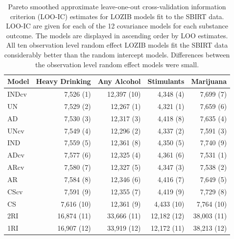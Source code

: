 \documentclass[12pt]{article}
\begin{document}
\begin{table}
	\caption{Pareto smoothed approximate leave-one-out cross-validation information criterion (LOO-IC) estimates for LOZIB models fit to the SBIRT data. LOO-IC are given for each of the 12 covariance models for each substance outcome. The models are displayed in ascending order by LOO estimates. All ten observation level random effect LOZIB models fit the SBIRT data considerably better than the random intercept models. Differences between the observation level random effect models were small.}
	\centering
	\begin{tabular}[t]{lrrrr}
		\toprule
		Model & Heavy Drinking & Any Alcohol& Stimulants & Marijuana\\
		\midrule
		INDcv & 7,526 (1) & 12,397 (10) & 4,348 (4) & 7,699 (7)\\
		UN & 7,529 (2) & 12,267 (1) & 4,321 (1) & 7,659 (6)\\
		AD & 7,530 (3) & 12,317 (3) & 4,418 (8) & 7,635 (4)\\
		UNcv & 7,549 (4) & 12,296 (2) & 4,337 (2)  & 7,591 (3)\\
		IND & 7,559 (5) & 12,361 (8) & 4,350 (5) & 7,740 (9)\\
		ADcv & 7,577 (6) & 12,325 (4) & 4,361 (6) & 7,531 (1)\\
		ARcv & 7,580 (7) & 12,327 (5) & 4,347 (3) & 7,538 (2)\\
		AR & 7,584 (8) & 12,346 (6) & 4,416 (7) & 7,649 (5)\\
		CScv & 7,591 (9) & 12,355 (7) & 4,419 (9) & 7,729 (8)\\
		CS & 7,616 (10) & 12,361 (9)& 4,433 (10) & 7,764 (10)\\
		\addlinespace
		2RI & 16,874 (11) & 33,666 (11) & 12,182 (12) & 38,003 (11)\\
		1RI & 16,907 (12) & 33,919 (12) & 12,172 (11)& 38,213 (12)\\
		\bottomrule
	\end{tabular}
	\label{tab:loo}
\end{table}
\end{document}
